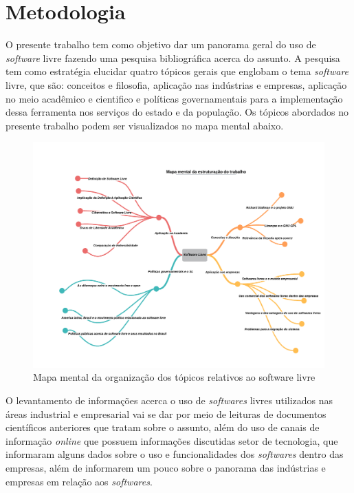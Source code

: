 \documentclass[12pt]{article}
\begin{document}
\newpage

\section{Metodologia}

O presente trabalho tem como objetivo dar um panorama geral do uso de \textit{software} livre fazendo uma pesquisa bibliográfica acerca do assunto. A pesquisa tem como estratégia elucidar quatro tópicos gerais que englobam o tema \textit{software} livre, que são: conceitos e filosofia, aplicação nas indústrias e empresas, aplicação no meio acadêmico e cientifico e políticas governamentais para a implementação dessa ferramenta nos serviços do estado e da população. Os tópicos abordados no presente trabalho podem ser visualizados no mapa mental abaixo.

\begin{figure}[h!]
  \begin{center}
    \caption{\label{fig:mapa}Mapa mental da organização dos tópicos relativos ao software livre}
    \includegraphics[width=\textwidth]{images/Mapa mental com linhas (1).png}
  \end{center}
\end{figure}

O levantamento de informações acerca o uso de \textit{softwares} livres utilizados nas áreas industrial e empresarial vai se dar por meio de leituras de documentos científicos anteriores que tratam sobre o assunto, além do uso de canais de informação \textit{online} que possuem informações discutidas setor de tecnologia, que informaram alguns dados sobre o uso e funcionalidades dos \textit{softwares} dentro das empresas, além de informarem um pouco sobre o panorama das indústrias e empresas em relação aos \textit{softwares}.
\end{document}
